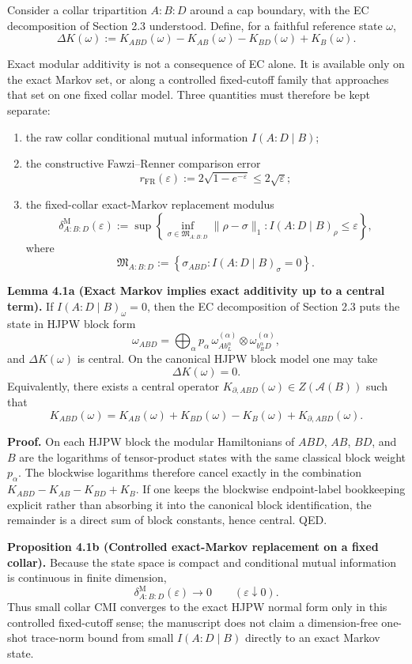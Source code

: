 Consider a collar tripartition \(A:B:D\) around a cap boundary, with the EC decomposition of Section 2.3 understood. Define, for a faithful reference state \(\omega\),
\[
\Delta K(\omega)
:=
K_{ABD}(\omega)-K_{AB}(\omega)-K_{BD}(\omega)+K_B(\omega).
\]

Exact modular additivity is not a consequence of EC alone. It is available only on the exact Markov set, or along a controlled fixed-cutoff family that approaches that set on one fixed collar model. Three quantities must therefore be kept separate:
\begin{enumerate}
\item the raw collar conditional mutual information \(I(A:D\mid B)\);
\item the constructive Fawzi--Renner comparison error
\[
r_{\mathrm{FR}}(\varepsilon):=
2\sqrt{1-e^{-\varepsilon}}
\le
2\sqrt{\varepsilon};
\]
\item the fixed-collar exact-Markov replacement modulus
\[
\delta^{\mathrm M}_{A:B:D}(\varepsilon)
:=
\sup\left\{
\inf_{\sigma\in\mathfrak M_{A:B:D}}\|\rho-\sigma\|_1:
I(A:D\mid B)_\rho\le \varepsilon
\right\},
\]
where
\[
\mathfrak M_{A:B:D}
:=
\left\{
\sigma_{ABD}: I(A:D\mid B)_\sigma=0
\right\}.
\]
\end{enumerate}

\textbf{Lemma 4.1a (Exact Markov implies exact additivity up to a central term).} If \(I(A:D \mid B)_\omega = 0\), then the EC decomposition of Section 2.3 puts the state in HJPW block form
\[
\omega_{ABD}
=
\bigoplus_{\alpha}
p_{\alpha}\,
\omega^{(\alpha)}_{A b_L^{\alpha}}
\otimes
\omega^{(\alpha)}_{b_R^{\alpha} D},
\]
and \(\Delta K(\omega)\) is central. On the canonical HJPW block model one may take
\[
\Delta K(\omega)=0.
\]
Equivalently, there exists a central operator \(K_{\partial,ABD}(\omega)\in Z(\mathcal A(B))\) such that
\[
K_{ABD}(\omega)
=
K_{AB}(\omega)+K_{BD}(\omega)-K_B(\omega)+K_{\partial,ABD}(\omega).
\]

\textbf{Proof.} On each HJPW block the modular Hamiltonians of \(ABD\), \(AB\), \(BD\), and \(B\) are the logarithms of tensor-product states with the same classical block weight \(p_\alpha\). The blockwise logarithms therefore cancel exactly in the combination \(K_{ABD}-K_{AB}-K_{BD}+K_B\). If one keeps the blockwise endpoint-label bookkeeping explicit rather than absorbing it into the canonical block identification, the remainder is a direct sum of block constants, hence central. QED.

\textbf{Proposition 4.1b (Controlled exact-Markov replacement on a fixed collar).}
Because the state space is compact and conditional mutual information is continuous in finite dimension,
\[
\delta^{\mathrm M}_{A:B:D}(\varepsilon)\longrightarrow 0
\qquad
(\varepsilon\downarrow0).
\]
Thus small collar CMI converges to the exact HJPW normal form only in this controlled fixed-cutoff sense; the manuscript does not claim a dimension-free one-shot trace-norm bound from small \(I(A:D\mid B)\) directly to an exact Markov state.

